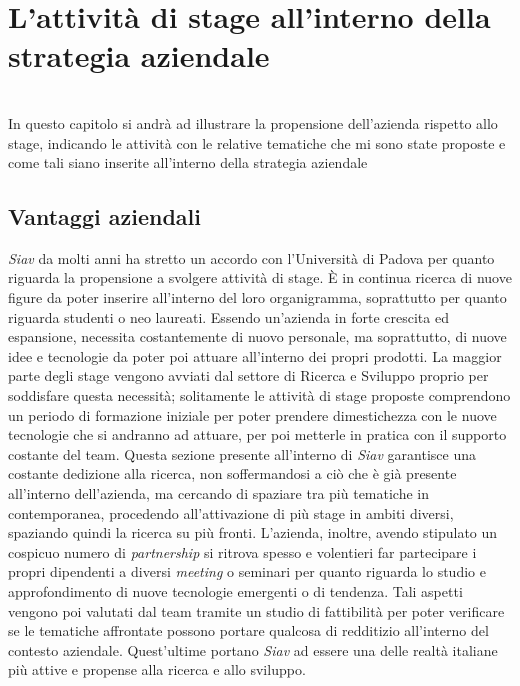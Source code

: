 
\chapter{L'attività di stage all'interno della strategia aziendale}
\label{cap:processi-metodologie}
\\
  In questo capitolo si andrà ad illustrare la propensione dell'azienda rispetto allo stage, indicando le attività con le relative tematiche che mi sono state proposte e come tali siano inserite all'interno della strategia aziendale\\

\section{Vantaggi aziendali}
\textit{Siav} da molti anni ha stretto un accordo con l'Università di Padova per quanto riguarda la propensione a svolgere attività di stage. È in continua ricerca di nuove figure da poter inserire all'interno del loro organigramma, soprattutto per quanto riguarda studenti o neo laureati.  Essendo un'azienda in forte crescita ed espansione, necessita costantemente di nuovo personale, ma soprattutto, di nuove idee e tecnologie da poter poi attuare all'interno dei propri prodotti. La maggior parte degli stage vengono avviati dal settore di Ricerca e Sviluppo proprio per soddisfare questa necessità; solitamente le attività di stage proposte comprendono un periodo di formazione iniziale per poter prendere dimestichezza con le nuove tecnologie che si andranno ad attuare, per poi metterle in pratica con il supporto costante del team. Questa sezione presente all'interno di \textit{Siav} garantisce una costante dedizione alla ricerca, non soffermandosi a ciò che è già presente all'interno dell'azienda, ma cercando di spaziare tra più tematiche in contemporanea, procedendo all'attivazione di più stage in ambiti diversi, spaziando quindi la ricerca su più fronti. L'azienda, inoltre, avendo stipulato un cospicuo numero di \textit{partnership} si ritrova spesso e volentieri far partecipare i propri dipendenti a diversi \textit{meeting} o seminari per quanto riguarda lo studio e approfondimento di nuove tecnologie emergenti o di tendenza. Tali aspetti vengono poi valutati dal team tramite un studio di fattibilità per poter verificare se le tematiche affrontate possono portare qualcosa di redditizio all'interno del contesto aziendale. Quest'ultime portano \textit{Siav} ad essere una delle realtà italiane più attive e propense alla ricerca e allo sviluppo.

